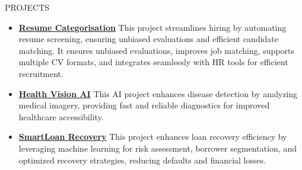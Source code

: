 \documentclass{resume}
\begin{document}
\begin{rSection}{PROJECTS}
    \begin{itemize}
        \item \textbf{\href{https://github.com}{Resume Categorisation}} {This project streamlines hiring by automating resume screening, ensuring unbiased evaluations and efficient candidate matching. It ensures unbiased evaluations, improves job matching, supports multiple CV formats, and integrates seamlessly with HR tools for efficient recruitment.}
        \vspace{-0.2em}
        \item \textbf{\href{https://github.com}{Health Vision AI}} {This AI project enhances disease detection by analyzing medical imagery, providing fast and reliable diagnostics for improved healthcare accessibility.}
        \vspace{-0.2em}
        \item \textbf{\href{https://github.com}{SmartLoan Recovery}} {This project enhances loan recovery efficiency by leveraging machine learning for risk assessment, borrower segmentation, and optimized recovery strategies, reducing defaults and financial losses.}
        \vspace{-0.2em}
    \end{itemize}
\end{rSection}
\vspace{-0.4em}
\end{document}
